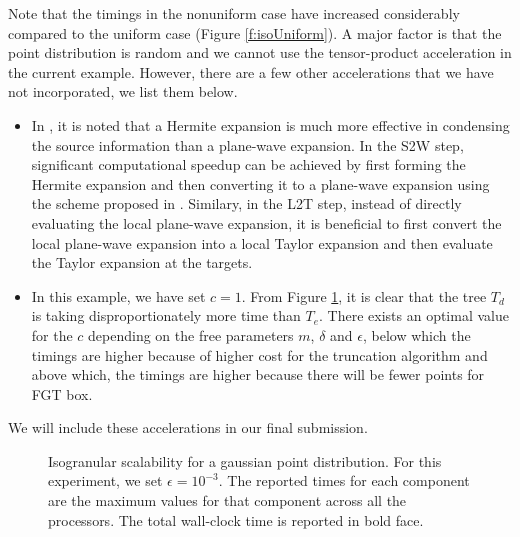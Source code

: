 Note that the timings in the nonuniform case have increased considerably compared to the uniform case (Figure \ref{f:isoUniform}). A 
major factor is that the point distribution is random and we cannot use the tensor-product acceleration in the current example. However,
 there are a few other accelerations that we have not incorporated, we list them below.
%
\begin{itemize}
  \item In \cite{fggt}, it is noted that a Hermite expansion is much more effective in condensing the source information than a plane-wave
   expansion. In the S2W step, significant computational speedup can be achieved by first forming the Hermite expansion and then converting 
   it to a plane-wave expansion using the scheme proposed in \cite{fggt}. Similary, in the L2T step, instead of directly evaluating the 
   local plane-wave expansion, it is beneficial to first convert the local plane-wave expansion into a local Taylor expansion and then evaluate 
   the Taylor expansion at the targets. 
  \item In this example, we have set $c = 1$. From Figure \ref{f:isoGaussian}, it is clear that the tree $T_d$ is taking disproportionately 
  more time than $T_e$. There exists an optimal value for the $c$ depending on the free parameters $m$, $\delta$ and $\epsilon$, below which
  the timings are higher because of higher cost for the truncation algorithm and above which, the timings are higher because there will be fewer points for FGT box.
\end{itemize}
%
We will include these accelerations in our final submission. 

\begin{figure}
	\begin{center}
	
	\end{center}
\caption{\label{f:isoGaussian} Isogranular scalability for a gaussian point distribution. For
 this experiment, we set $\epsilon = 10^{-3}$. The reported times for each component are the
 maximum values for that component across all the processors. The total wall-clock
time is reported in bold face.} 
\end{figure}
